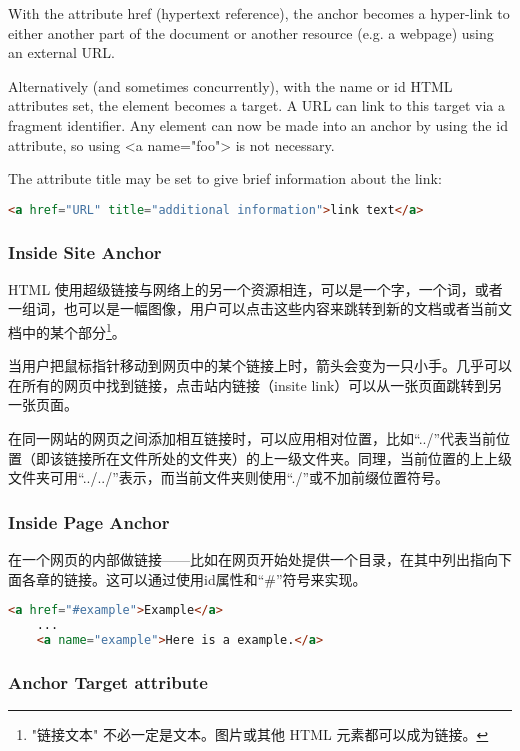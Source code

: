 With the attribute href (hypertext reference), the anchor becomes a hyper-link to either another part of the document or another resource (e.g. a webpage) using an external URL.

Alternatively (and sometimes concurrently), with the name or id HTML attributes set, the element becomes a target. A  URL can link to this target via a fragment identifier. Any element can now be made into an anchor by using the id attribute, so using <a name="foo"> is not necessary.

The attribute title may be set to give brief information about the link:

\begin{lstlisting}[language=HTML]
	<a href="URL" title="additional information">link text</a>
\end{lstlisting}



\subsubsection{Inside Site Anchor}

HTML 使用超级链接与网络上的另一个资源相连，可以是一个字，一个词，或者一组词，也可以是一幅图像，用户可以点击这些内容来跳转到新的文档或者当前文档中的某个部分\footnote{"链接文本" 不必一定是文本。图片或其他 HTML 元素都可以成为链接。}。

当用户把鼠标指针移动到网页中的某个链接上时，箭头会变为一只小手。几乎可以在所有的网页中找到链接，点击站内链接（insite link）可以从一张页面跳转到另一张页面。

在同一网站的网页之间添加相互链接时，可以应用相对位置，比如“../”代表当前位置（即该链接所在文件所处的文件夹）的上一级文件夹。同理，当前位置的上上级文件夹可用“../../”表示，而当前文件夹则使用“./”或不加前缀位置符号。


\subsubsection{Inside Page Anchor}


在一个网页的内部做链接——比如在网页开始处提供一个目录，在其中列出指向下面各章的链接。这可以通过使用id属性和“\#”符号来实现。

\begin{lstlisting}[language=HTML]
	<a href="#example">Example</a>
	...
	<a name="example">Here is a example.</a>
\end{lstlisting}



\subsubsection{Anchor Target attribute}

